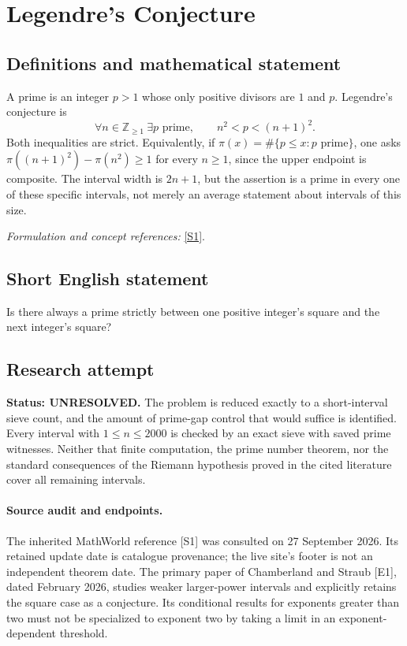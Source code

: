 \documentclass[11pt]{article}
\begin{document}
\section*{\texorpdfstring{Legendre's Conjecture}{Legendre's Conjecture}}\label{25}
\subsection{Definitions and mathematical statement}
A prime is an integer $p>1$ whose only positive divisors are $1$ and $p$. Legendre's conjecture is
\[
 \forall n\in{\mathbb{Z}}_{\ge1}\ \exists p\text{ prime},
 \qquad n^2<p<(n+1)^2.
\]
Both inequalities are strict. Equivalently, if $\pi(x)=\#\{p\le x:p\text{ prime}\}$, one asks $\pi((n+1)^2)-\pi(n^2)\ge1$ for every $n\ge1$, since the upper endpoint is composite. The interval width is $2n+1$, but the assertion is a prime in every one of these specific intervals, not merely an average statement about intervals of this size.
\par\smallskip\textit{Formulation and concept references:} \href{https://mathworld.wolfram.com/LegendresConjecture.html}{[S1]}.

\subsection{Short English statement}
Is there always a prime strictly between one positive integer's square and the next integer's square?
\subsection{Research attempt}
\textbf{Status: UNRESOLVED.} The problem is reduced exactly to a short-interval sieve count, and the amount of prime-gap control that would suffice is identified. Every interval with $1\le n\le2000$ is checked by an exact sieve with saved prime witnesses. Neither that finite computation, the prime number theorem, nor the standard consequences of the Riemann hypothesis proved in the cited literature cover all remaining intervals.

\paragraph{Source audit and endpoints.}
The inherited MathWorld reference [S1] was consulted on 27 September 2026. Its retained update date is catalogue provenance; the live site's footer is not an independent theorem date. The primary paper of Chamberland and Straub [E1], dated February 2026, studies weaker larger-power intervals and explicitly retains the square case as a conjecture. Its conditional results for exponents greater than two must not be specialized to exponent two by taking a limit in an exponent-dependent threshold.
\end{document}
